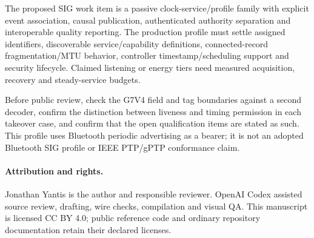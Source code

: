 \documentclass[11pt,letterpaper]{article}
\begin{document}
The proposed SIG work item is a passive clock-service/profile family with explicit event association, causal publication, authenticated authority separation and interoperable quality reporting. The production profile must settle assigned identifiers, discoverable service/capability definitions, connected-record fragmentation/MTU behavior, controller timestamp/scheduling support and security lifecycle. Claimed listening or energy tiers need measured acquisition, recovery and steady-service budgets.

Before public review, check the G7V4 field and tag boundaries against a second decoder, confirm the distinction between liveness and timing permission in each takeover case, and confirm that the open qualification items are stated as such. This profile uses Bluetooth periodic advertising as a bearer; it is not an adopted Bluetooth SIG profile or IEEE PTP/gPTP conformance claim.

\paragraph{Attribution and rights.} Jonathan Yantis is the author and responsible reviewer. OpenAI Codex assisted source review, drafting, wire checks, compilation and visual QA. This manuscript is licensed CC BY 4.0; public reference code and ordinary repository documentation retain their declared licenses.
\end{document}
